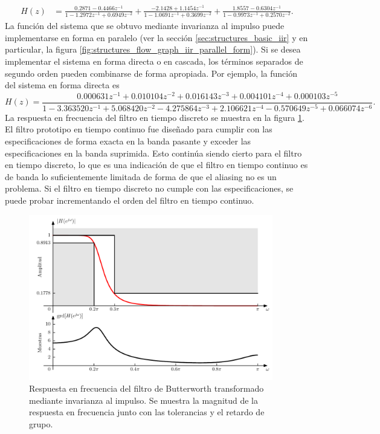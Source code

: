 \documentclass[a4paper]{report}
\begin{document}
\begin{equation}\label{eq:filter_design_example_07_02_Hz_cascade}
 \begin{aligned}
  H(z)&=\frac{0.2871-0.4466z^{-1}}{1-1.2972z^{-1}+0.6949z^{-2}}+\frac{-2.1428+1.1454z^{-1}}{1-1.0691z^{-1}+0.3699z^{-2}}+\frac{1.8557-0.6304z^{-1}}{1-0.9973z^{-1}+0.2570z^{-2}}.
 \end{aligned}
\end{equation}
La función del sistema que se obtuvo mediante invarianza al impulso puede implementarse en forma en paralelo (ver la sección \ref{sec:structures_basic_iir} y en particular, la figura \ref{fig:structures_flow_graph_iir_parallel_form}). Si se desea implementar el sistema en forma directa o en cascada, los términos separados de segundo orden pueden combinarse de forma apropiada. Por ejemplo, la función del sistema en forma directa es
\[
 H(z)=\frac{0.000631z^{-1}+0.010104z^{-2}+0.016143z^{-3}+0.004101z^{-4}+0.000103z^{-5}}{1-3.363520z^{-1} +5.068420z^{-2}-4.275864z^{-3}+2.106621z^{-4}-0.570649z^{-5}+0.066074z^{-6}}.
\]
La respuesta en frecuencia del filtro en tiempo discreto se muestra en la figura \ref{fig:filter_design_example_07_02_freq_response}. El filtro prototipo en tiempo continuo fue diseñado para cumplir con las especificaciones de forma exacta en la banda pasante y exceder las especificaciones en la banda suprimida. Esto continúa siendo cierto para el filtro en tiempo discreto, lo que es una indicación de que el filtro en tiempo continuo es de banda lo suficientemente limitada de forma de que el aliasing no es un problema. Si el filtro en tiempo discreto no cumple con las especificaciones, se puede probar incrementando el orden del filtro en tiempo continuo.
\begin{figure}[!htb]
 \begin{center}
 \includegraphics[width=0.95\textwidth]{figuras/filter_design_example_07_02_freq_response.pdf}
 \caption{\label{fig:filter_design_example_07_02_freq_response} Respuesta en frecuencia del filtro de Butterworth transformado mediante invarianza al impulso. Se muestra la magnitud de la respuesta en frecuencia junto con las tolerancias y el retardo de grupo.}
 \end{center}
\end{figure}
\end{document}
